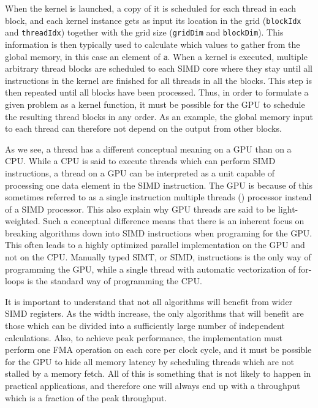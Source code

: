 When the kernel is launched, a copy of it is scheduled for each thread in each block, and each kernel instance gets as input its location in the grid (\texttt{blockIdx} and \texttt{threadIdx}) together with the grid size (\texttt{gridDim} and \texttt{blockDim}). This information is then typically used to calculate which values to gather from the global memory, in this case an element of \texttt{a}. %
When a kernel is executed, multiple arbitrary thread blocks are scheduled to each SIMD core where they stay until all instructions in the kernel are finished for all threads in all the blocks. This step is then repeated until all blocks have been processed. Thus,  in order to formulate a given problem as a kernel function, it must be possible for the GPU to schedule the resulting thread blocks in any order. As an example, the global memory input to each thread can therefore not depend on the output from other blocks.

As we see, a thread has a different conceptual meaning on a GPU than on a CPU.  While a CPU is said to execute threads which can perform SIMD instructions, a thread on a GPU can be interpreted as a unit capable of processing one data element in the SIMD instruction. The GPU is because of this sometimes referred to as a single instruction multiple threads () processor instead of a SIMD processor. This also explain why GPU threads are said to be light-weighted. Such a conceptual difference means that there is an inherent focus on breaking algorithms down into SIMD instructions when programing for the GPU. This often leads to a highly optimized parallel implementation on the GPU and not on the CPU. Manually typed SIMT, or SIMD, instructions is the only way of programming the GPU, while a single thread with automatic vectorization of for-loops is the standard way of programming the CPU. 

It is important to understand that not all algorithms will benefit from wider SIMD registers. As the width increase, the only algorithms that will benefit are those which can be divided into a sufficiently large number of independent calculations. Also, to achieve peak performance, the implementation must perform one FMA operation on each core per clock cycle, and it must be possible for the GPU to hide all memory latency by scheduling threads which are not stalled by a memory fetch. All of this is something that is not likely to happen in practical applications, and therefore one will always end up with a throughput which is a fraction of the peak throughput.

